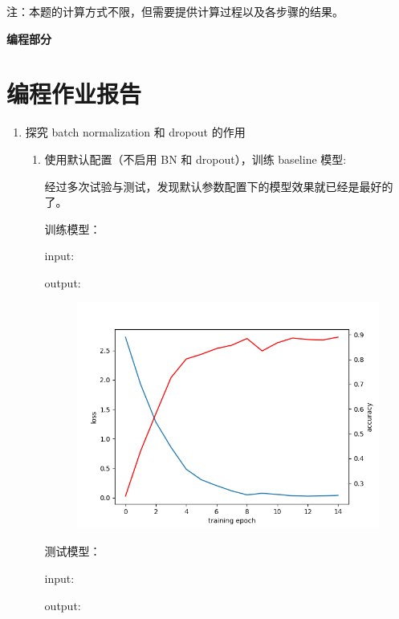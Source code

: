 \documentclass[a4paper]{article}
\begin{document}
注：本题的计算方式不限，但需要提供计算过程以及各步骤的结果。
\vspace{6mm}

\centerline{\textbf{\Large{编程部分}}}
\vspace{3mm}

\section{编程作业报告}
\begin{enumerate}
    \item 探究 batch normalization 和 dropout 的作用
    
    \begin{enumerate}
        \item 使用默认配置（不启用 BN 和 dropout），训练 baseline 模型:
        
        经过多次试验与测试，发现默认参数配置下的模型效果就已经是最好的了。

        训练模型：
        
        input:
        

        output:
        
        \begin{figure}[H]
            \centering
            \includegraphics[width=0.65\linewidth]{../result/1_1-0.png}
            \caption{}
        \end{figure}

        测试模型：

        input:
        

        output:
        
        \vspace{2em}


\end{enumerate}
\end{enumerate}
\end{document}
